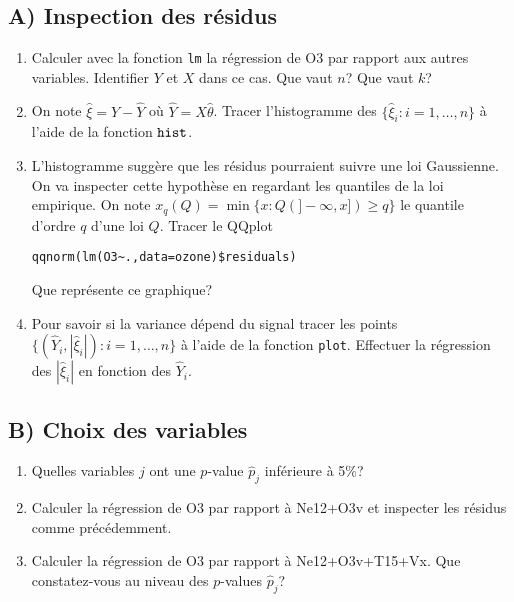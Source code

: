 \documentclass[a4paper,11pt,fleqn]{article}
\newcommand{\1}{\ensuremath{\mathbbm{1}}}
\begin{document}
\subsection*{A) Inspection des r\'esidus}
\begin{enumerate}
\item Calculer avec la fonction {\tt lm} la r\'egression de O3 par rapport aux autres variables. Identifier $Y$ et $X$ dans ce cas.  Que vaut $n$? Que vaut $k$?
\item On note $\hat\xi=Y-\hat Y$ o\`u $\hat Y=X\widehat \theta$. Tracer l'histogramme des $\{\hat \xi_{i}:i=1,\ldots,n\}$ \`a l'aide de la fonction ${\tt hist}$.
\item L'histogramme sugg\`ere que les r\'esidus pourraient suivre une loi Gaussienne. On va inspecter cette hypoth\`ese en regardant les quantiles de la loi empirique. On note $x_{q}(Q)=\min\{x : {Q}(]-\infty,x])\geq q\}$ le quantile d'ordre $q$ d'une loi $Q$. Tracer le QQplot
\begin{verbatim}
qqnorm(lm(O3~.,data=ozone)$residuals)
\end{verbatim}
 Que repr\'esente ce graphique?
 \item Pour savoir si la variance d\'epend du signal tracer les points $\big\{(\hat Y_{i},|\hat\xi_{i}|):i=1,\ldots,n\big\}$ \`a l'aide de la fonction {\tt plot}. Effectuer la r\'egression des $|\hat\xi_{i}|$ en fonction des $\hat Y_{i}$.
\end{enumerate}


\subsection*{B) Choix des variables}
\begin{enumerate}
\item Quelles variables $j$ ont une $p$-value $\hat p_{j}$ inf\'erieure \`a 5\%?
\item Calculer la r\'egression de O3 par rapport \`a Ne12+O3v et inspecter les r\'esidus comme pr\'ec\'edemment.
\item Calculer la r\'egression de O3 par rapport \`a Ne12+O3v+T15+Vx. Que constatez-vous au niveau des  $p$-values $\hat p_{j}$?
\end{enumerate}
\end{document}
